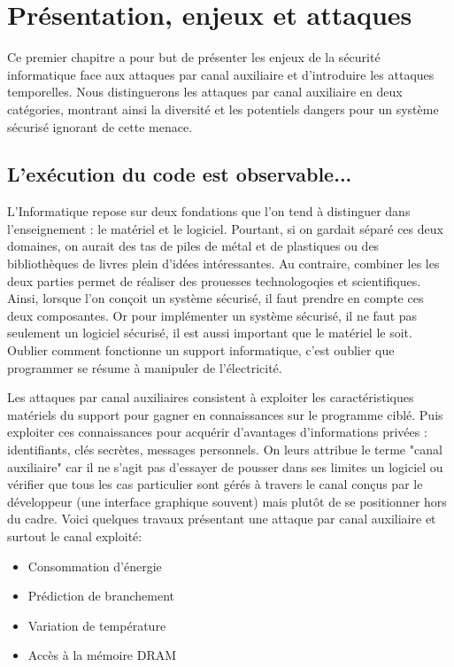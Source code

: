 \chapter{Présentation, enjeux et attaques}
\label{chap:constantTimePresentation}


Ce premier chapitre a pour but de présenter les enjeux de la sécurité informatique face aux attaques par canal auxiliaire et d'introduire les attaques temporelles. Nous distinguerons les attaques par canal auxiliaire en deux catégories, montrant ainsi la diversité et les potentiels dangers pour un système sécurisé ignorant de cette menace.



\section{L'exécution du code est observable...}

L'Informatique repose sur deux fondations que l'on tend à distinguer dans l'enseignement : le matériel et le logiciel. Pourtant, si on gardait séparé ces deux domaines, on aurait des tas de piles de métal et de plastiques ou des bibliothèques de livres plein d'idées intéressantes. Au contraire, combiner les les deux parties permet de réaliser des prouesses technologoqies et scientifiques. Ainsi, lorsque l'on conçoit un système sécurisé, il faut prendre en compte ces deux composantes. Or pour implémenter un système sécurisé, il ne faut pas seulement un logiciel sécurisé, il est aussi important que le matériel le soit. Oublier comment fonctionne un support informatique, c'est oublier que programmer se résume à manipuler de l'électricité.\medbreak

Les attaques par canal auxiliaires consistent à exploiter les caractéristiques matériels du support pour gagner en connaissances sur le programme ciblé. Puis exploiter ces connaissances pour acquérir d'avantages d'informations privées : identifiants, clés secrètes, messages personnels. On leurs attribue le terme "canal auxiliaire" car il ne s'agit pas d'essayer de pousser dans ses limites un logiciel ou vérifier que tous les cas particulier sont gérés à travers le canal conçus par le développeur (une interface graphique souvent) mais plutôt de se positionner hors du cadre. Voici quelques travaux présentant une attaque par canal auxiliaire et surtout le canal exploité:
\begin{itemize}
    \item[\cite{DPA_Attack}] Consommation d'énergie 
    \item[\cite{Branch_Attack}] Prédiction de branchement 
    \item[\cite{Thermal_Attack}] Variation de température
    \item[\cite{DRAM_Attack}] Accès à la mémoire DRAM
\end{itemize}\medbreak

